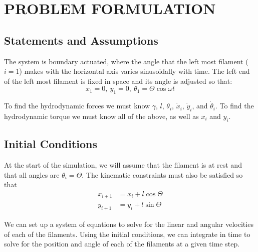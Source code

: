 \documentclass[12pt,letterpaper,titlepage]{article}
\begin{document}
\maketitle
\section{PROBLEM FORMULATION}
\subsection{Statements and Assumptions}
The system is boundary actuated, where the angle that the left most filament ($i=1$) makes with the horizontal axis varies sinusoidally with time. The left end of the left most filament is fixed in space and its angle is adjusted so that:
\begin{equation}
x_1 = 0, \ y_1 = 0, \ \theta_1 = \Theta \cos \omega t
\end{equation}

To find the hydrodynamic forces we must know $\gamma$, $l$, $\theta_i$, $\dot{x}_i$, $\dot{y}_i$, and $\dot{\theta}_i$. To find the hydrodynamic torque we must know all of the above, as well as $x_i$ and $y_i$.

\subsection{Initial Conditions}
At the start of the simulation, we will assume that the filament is at rest and that all angles are $\theta_i = \Theta$. The kinematic constraints must also be satisfied so that
\begin{align*}
x_{i+1} &= x_{i} + l \cos \Theta \\
y_{i+1} &= y_{i} + l \sin \Theta 
\end{align*}

We can set up a system of equations to solve for the linear and angular velocities of each of the filaments. Using the initial conditions, we can integrate in time to solve for the position and angle of each of the filaments at a given time step.
\end{document}
